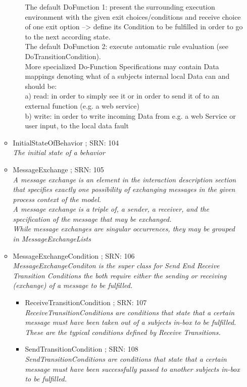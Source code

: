 \begin{itemize}
\begin{itemize}
\begin{itemize}
{			The default DoFunction 1: present the surrounding execution environment with the given exit choices/conditions and receive choice of one exit option --> define its Condition to be fulfilled in order to go to the next according state.\\
			The default DoFunction 2: execute automatic rule evaluation (see DoTransitionCondition).\\
			More specialized Do-Function Specifications may contain Data mappings denoting what of a subjects internal local Data can and should be:\\
			a) read: in order to simply see it or in order to send it of to an external function (e.g. a web service)\\
			b) write: in order to write incoming Data from e.g. a web Service or user input, to the local data fault}
	\end{itemize}
	\item InitialStateOfBehavior ; SRN: 104 \\ \textit{The initial state of a behavior}
	\item MessageExchange ; SRN: 105 \\ \textit{A message exchange is an element in the interaction description section that specifies exactly one possibility of exchanging messages in the given process context of the model.\\
	A message exchange is a triple of, a sender, a receiver, and the specification of the message that may be exchanged.\\
	While message exchanges are singular occurrences, they may be grouped in MessageExchangeLists}
	\item MessageExchangeCondition ; SRN: 106 \\ \textit{MessageExchangeConditon is the super class for Send End Receive Transition Conditions the both require either the sending or receiving (exchange) of a message to be fulfilled.}
	\begin{itemize}
		\item ReceiveTransitionCondition ; SRN: 107 \\ \textit{ReceiveTransitionConditions are conditions that state that a certain message must have been taken out of a subjects in-box to be fulfilled.\\
		These are the typical conditions defined by Receive Transitions.}
		\item SendTransitionCondition ; SRN: 108 \\ \textit{SendTransitionConditions are conditions that state that a certain message must have been successfully passed to another subjects in-box to be fulfilled.\\
}
\end{itemize}
\end{itemize}
\end{itemize}
